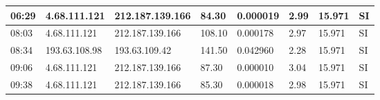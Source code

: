 \begin{table}[H]
\begin{tabular}{|l|l|l|l|l|l|l|l|}
		06:29 & 4.68.111.121 & 212.187.139.166 & 84.30 & 0.000019 & 2.99 & 15.971 & SI \\ \hline
		08:03 & 4.68.111.121 & 212.187.139.166 & 108.10 & 0.000178 & 2.97 & 15.971 & SI \\ \hline
		08:34 & 193.63.108.98 & 193.63.109.42 & 141.50 & 0.042960 & 2.28 & 15.971 & SI \\ \hline
		09:06 & 4.68.111.121 & 212.187.139.166 & 87.30 & 0.000010 & 3.04 & 15.971 & SI \\ \hline
		09:38 & 4.68.111.121 & 212.187.139.166 & 85.30 & 0.000018 & 2.98 & 15.971 & SI \\ \hline
	\end{tabular}
\end{table}